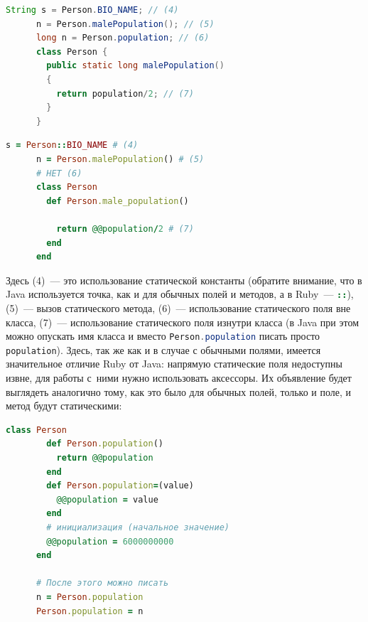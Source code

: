 \documentclass[a4paper, 14pt, titlepage]{extarticle}
\newenvironment{halfpage}%
    {\noindent\begin{minipage}[h]{0.49\linewidth}} %
    {\end{minipage}\hfill}
\newcommand{\inlinecode}[2][Java]{\lstinline[basicstyle=\ttfamily, language=#1]{#2}}
\begin{document}
  \begin{halfpage}
    \begin{lstlisting}[language=Java, title={Использование static'ов в Java}, gobble=6, texcl]
      String s = Person.BIO_NAME; // (4)
      n = Person.malePopulation(); // (5)
      long n = Person.population; // (6)
      class Person {
        public static long malePopulation()
        {
          return population/2; // (7)
        }
      }
    \end{lstlisting}
  \end{halfpage}
  \begin{halfpage}
    \begin{lstlisting}[language=Ruby, title={Использование static'ов в Ruby}, gobble=6, texcl]
      s = Person::BIO_NAME # (4)
      n = Person.malePopulation() # (5)
      # НЕТ (6)
      class Person
        def Person.male_population()

          return @@population/2 # (7)
        end
      end
    \end{lstlisting}
  \end{halfpage}
  
  Здесь (4)~--- это использование статической константы (обратите внимание, что в Java используется
  точка, как и для обычных полей и методов, а в Ruby~--- \inlinecode[Ruby]{::}), (5)~--- вызов
  статического метода, (6)~--- использование статического поля вне класса, (7)~--- использование
  статического поля изнутри класса (в Java при этом можно опускать имя класса и вместо
  \inlinecode{Person.population} писать просто \inlinecode{population}). Здесь, так же как и в
  случае с обычными полями, имеется значительное отличие Ruby от Java: напрямую статические поля
  недоступны извне, для работы с~ними нужно использовать аксессоры. Их объявление будет выглядеть
  аналогично тому, как это было для обычных полей, только и поле, и метод будут статическими:

  \begin{center}
  \begin{halfpage}
    \begin{lstlisting}[language=Ruby, title={Статические аксессоры в Ruby}, gobble=6, texcl]
      class Person
        def Person.population()
          return @@population
        end
        def Person.population=(value)
          @@population = value
        end
        # инициализация (начальное значение)
        @@population = 6000000000
      end

      # После этого можно писать
      n = Person.population
      Person.population = n
    \end{lstlisting}
  \end{halfpage}
  \end{center}
\end{document}
